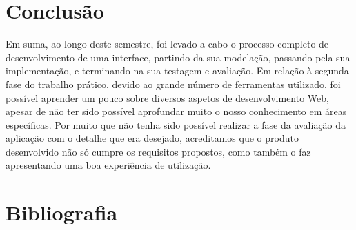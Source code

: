 \documentclass[12pt, a4paper]{article}
\begin{document}
\section{Conclusão}

Em suma, ao longo deste semestre, foi levado a cabo o processo completo de desenvolvimento de uma
interface, partindo da sua modelação, passando pela sua implementação, e terminando na sua testagem
e avaliação. Em relação à segunda fase do trabalho prático, devido ao grande número de ferramentas
utilizado, foi possível aprender um pouco sobre diversos aspetos de desenvolvimento Web, apesar de
não ter sido possível aprofundar muito o nosso conhecimento em áreas específicas. Por muito que não
tenha sido possível realizar a fase da avaliação da aplicação com o detalhe que era desejado,
acreditamos que o produto desenvolvido não só cumpre os requisitos propostos, como também o faz
apresentando uma boa experiência de utilização.

\begingroup
\section{Bibliografia}
\renewcommand{\section}[2]{}
\end{document}
